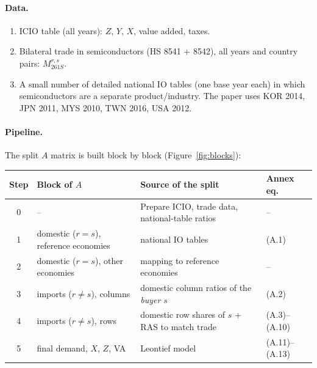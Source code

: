 \documentclass[11pt,a4paper]{article}
\theoremstyle{remark}
\theoremstyle{definition}
\newcommand{\sem}{{261S}}   %
\begin{document}
\paragraph{Data.}
\begin{enumerate}[nosep]
  \item ICIO table (all years): $Z$, $Y$, $X$, value added, taxes.
  \item Bilateral trade in semiconductors (HS 8541 + 8542), all years and country pairs: $M^{r,s}_\sem$.
  \item A small number of detailed national IO tables (one base year each) in which semiconductors are a
        separate product/industry. The paper uses KOR 2014, JPN 2011, MYS 2010, TWN 2016, USA 2012.
\end{enumerate}

\paragraph{Pipeline.} The split $A$ matrix is built block by block (Figure~\ref{fig:blocks}):

\begin{center}
\begin{tabular}{@{}clll@{}}
\toprule
Step & Block of $A$ & Source of the split & Annex eq. \\
\midrule
0 & -- & Prepare ICIO, trade data, national-table ratios & -- \\
1 & domestic ($r=s$), reference economies & national IO tables & (A.1) \\
2 & domestic ($r=s$), other economies & mapping to reference economies & -- \\
3 & imports ($r\neq s$), columns & domestic column ratios of the \emph{buyer} $s$ & (A.2) \\
4 & imports ($r\neq s$), rows & domestic row shares of $s$ + RAS to match trade & (A.3)--(A.10) \\
5 & final demand, $X$, $Z$, VA & Leontief model & (A.11)--(A.13) \\
\bottomrule
\end{tabular}
\end{center}
\end{document}
